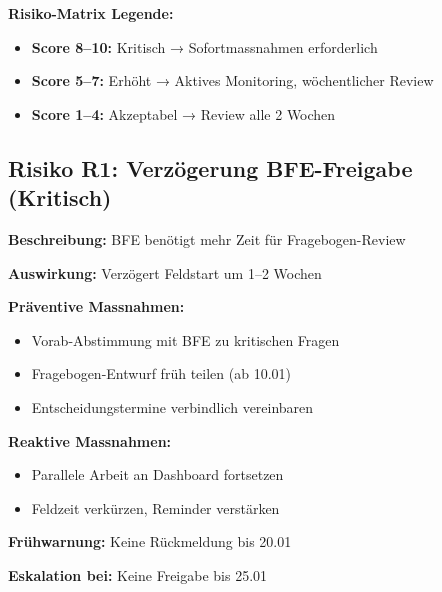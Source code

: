\documentclass[11pt,a4paper]{article}
\begin{document}
\begin{tcolorbox}[fabox]
\textbf{Risiko-Matrix Legende:}
\begin{itemize}[leftmargin=*]
    \item \textcolor{fared}{\textbf{Score 8--10:}} Kritisch → Sofortmassnahmen erforderlich
    \item \textcolor{faorange}{\textbf{Score 5--7:}} Erhöht → Aktives Monitoring, wöchentlicher Review
    \item \textcolor{fagreen}{\textbf{Score 1--4:}} Akzeptabel → Review alle 2 Wochen
\end{itemize}
\end{tcolorbox}

\subsection{Risiko R1: Verzögerung BFE-Freigabe (Kritisch)}

\begin{tcolorbox}[riskbox]
\textbf{Beschreibung:} BFE benötigt mehr Zeit für Fragebogen-Review

\textbf{Auswirkung:} Verzögert Feldstart um 1--2 Wochen

\vspace{0.3cm}
\textbf{Präventive Massnahmen:}
\begin{itemize}[leftmargin=*]
    \item Vorab-Abstimmung mit BFE zu kritischen Fragen
    \item Fragebogen-Entwurf früh teilen (ab 10.01)
    \item Entscheidungstermine verbindlich vereinbaren
\end{itemize}

\textbf{Reaktive Massnahmen:}
\begin{itemize}[leftmargin=*]
    \item Parallele Arbeit an Dashboard fortsetzen
    \item Feldzeit verkürzen, Reminder verstärken
\end{itemize}

\textbf{Frühwarnung:} Keine Rückmeldung bis 20.01

\textbf{Eskalation bei:} Keine Freigabe bis 25.01
\end{tcolorbox}

\newpage

\end{document}
